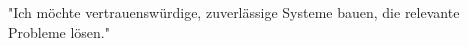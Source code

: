 \documentclass{resume}
\begin{document}
\begin{center}
    \small "Ich möchte vertrauenswürdige, zuverlässige Systeme bauen, die relevante Probleme lösen."



\end{center}
\end{document}
